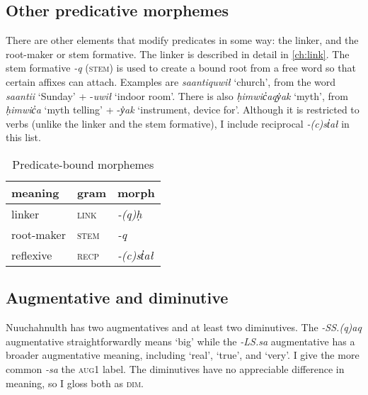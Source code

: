 \subsection{Other predicative morphemes}

There are other elements that modify predicates in some way: the linker, and the root-maker or stem formative. The linker is described in detail in \cref{ch:link}. The stem formative \textit{-q} (\textsc{stem}) is used to create a bound root from a free word so that certain affixes can attach. Examples are \textit{saantiquwił} `church', from the word \textit{saantii} `Sunday' + -\textit{uwił} `indoor room'. There is also \textit{ḥimwic̓aqy̓ak} `myth', from \textit{ḥimwic̓a} `myth telling' + -\textit{y̓ak} `instrument, device for'. Although it is restricted to verbs (unlike the linker and the stem formative), I include reciprocal \textit{-(c)st̓ał} in this list.

\begin{table}[ht]
\centering
\caption{Predicate-bound morphemes}
\label{table:predicate}
\begin{tabular}{lll}
meaning                         & gram              & morph                       \\ \hline
\multicolumn{1}{|l|}{linker}    & \multicolumn{1}{l|}{\textsc{link}} & \multicolumn{1}{l|}{\textit{-(q)ḥ}} \\ \hline
\multicolumn{1}{|l|}{root-maker}    & \multicolumn{1}{l|}{\textsc{stem}} & \multicolumn{1}{l|}{\textit{-q}} \\ \hline
\multicolumn{1}{|l|}{reflexive} & \multicolumn{1}{l|}{\textsc{recp}} & \multicolumn{1}{l|}{\textit{-(c)st̓ał}} \\ \hline
\end{tabular}
\end{table}

\subsection{Augmentative and diminutive}

Nuuchahnulth has two augmentatives and at least two diminutives. The \textit{-SS.(q)aq} augmentative straightforwardly means `big' while the \textit{-LS.sa} augmentative has a broader augmentative meaning, including `real', `true', and `very'. I give the more common \textit{-sa} the \textsc{aug1} label. The diminutives have no appreciable difference in meaning, so I gloss both as \textsc{dim}.

